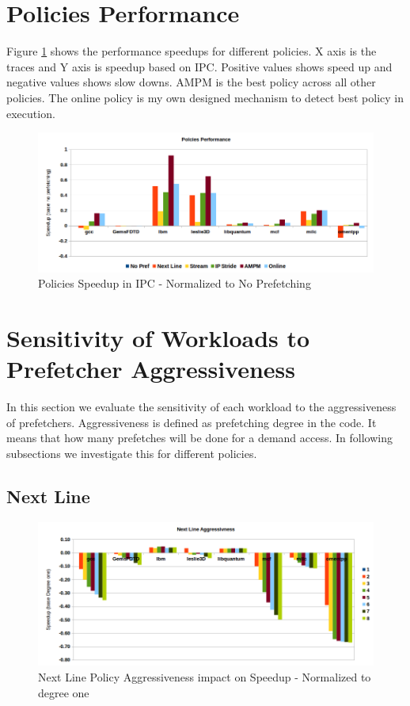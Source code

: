 \documentclass{article}
\begin{document}
\section{Policies Performance}
Figure \ref{pic:perf} shows the performance speedups for different policies. X axis is the traces and Y axis is speedup based on IPC. Positive values shows speed up and negative values shows slow downs. AMPM is the best policy across all other policies. The online policy is my own designed mechanism to detect best policy in execution. 

\begin{figure}[h!]
  \label{pic:perf}
  \centering
    \includegraphics[width=1\textwidth]{perf.png}
    \caption{Policies Speedup in IPC - Normalized to No Prefetching}
\end{figure}

\section{Sensitivity of Workloads to Prefetcher Aggressiveness}
In this section we evaluate the sensitivity of each workload to the aggressiveness of prefetchers. Aggressiveness is defined as prefetching degree in the code. It means that how many prefetches will be done for a demand access. In following subsections we investigate this for different policies.

\subsection{Next Line}

\begin{figure}[!h]
  \label{pic:next-agg}
  \centering
    \includegraphics[width=1\textwidth]{next_agg.png}
    \caption{Next Line Policy Aggressiveness impact on Speedup - Normalized to degree one}
\end{figure}
\end{document}
